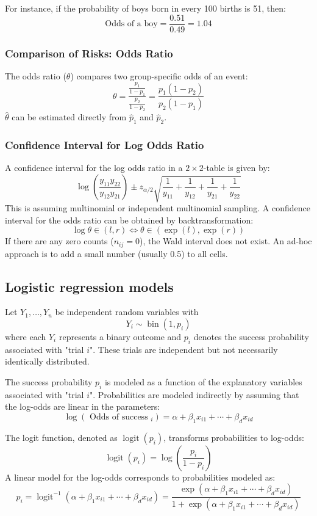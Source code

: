 \documentclass{article}
\begin{document}
For instance, if the probability of boys born in every 100 births is 51, then:
$$
\text{Odds of a boy} = \frac{0.51}{0.49} = 1.04
$$

\subsubsection{Comparison of Risks: Odds Ratio}
The odds ratio ($\theta$) compares two group-specific odds of an event:
$$
\theta = \frac{\frac{p_{1}}{1-p_{1}}}{\frac{p_{2}}{1-p_{2}}} = \frac{p_{1}\left(1-p_{2}\right)}{p_{2}\left(1-p_{1}\right)}
$$
$\hat{\theta}$ can be estimated directly from $\hat{p}_{1}$ and $\hat{p}_{2}$.

\subsubsection{Confidence Interval for Log Odds Ratio}
A confidence interval for the log odds ratio in a $2 \times 2$-table is given by:
$$
\log \left(\frac{y_{11} y_{22}}{y_{12} y_{21}}\right) \pm z_{\alpha / 2} \sqrt{\frac{1}{y_{11}}+\frac{1}{y_{12}}+\frac{1}{y_{21}}+\frac{1}{y_{22}}}
$$
This is assuming multinomial or independent multinomial sampling. A confidence interval for the odds ratio can be obtained by backtransformation:
$$
\log \theta \in (l, r) \Leftrightarrow \theta \in (\exp (l), \exp (r))
$$
If there are any zero counts ($n_{ij}=0$), the Wald interval does not exist. An ad-hoc approach is to add a small number (usually 0.5) to all cells.

\subsection{Logistic regression models}

Let $Y_{1}, \ldots, Y_{n}$ be independent random variables with
$$
Y_{i} \sim \operatorname{bin}\left(1, p_{i}\right)
$$
where each $Y_i$ represents a binary outcome and $p_{i}$ denotes the success probability associated with "trial $i$". These trials are independent but not necessarily identically distributed.

The success probability $p_{i}$ is modeled as a function of the explanatory variables associated with "trial $i$". Probabilities are modeled indirectly by assuming that the log-odds are linear in the parameters:
$$
\log \left(\text { Odds of success }_{i}\right) = \alpha+\beta_{1} x_{i 1}+\cdots+\beta_{d} x_{i d}
$$

The logit function, denoted as $\operatorname{logit}\left(p_{i}\right)$, transforms probabilities to log-odds:
$$
\operatorname{logit}\left(p_{i}\right) = \log \left(\frac{p_{i}}{1-p_{i}}\right)
$$
A linear model for the log-odds corresponds to probabilities modeled as:
$$
p_{i} = \operatorname{logit}^{-1}\left(\alpha+\beta_{1} x_{i 1}+\cdots+\beta_{d} x_{i d}\right)=\frac{\exp \left(\alpha+\beta_{1} x_{i 1}+\cdots+\beta_{d} x_{i d}\right)}{1+\exp \left(\alpha+\beta_{1} x_{i 1}+\cdots+\beta_{d} x_{i d}\right)}
$$
\end{document}
